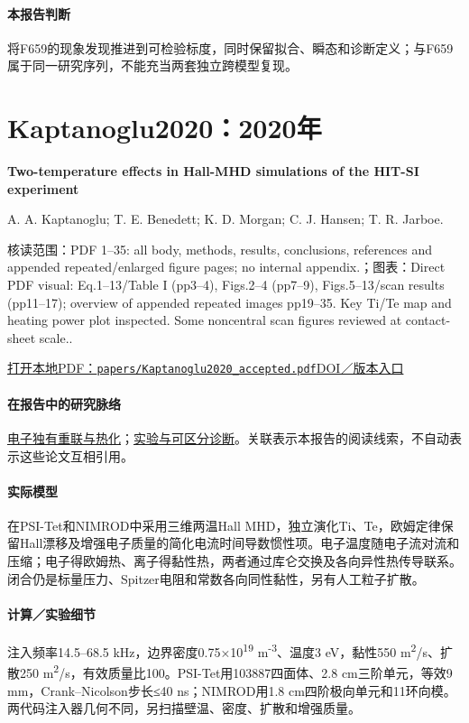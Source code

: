 \paragraph{本报告判断}将F659的现象发现推进到可检验标度，同时保留拟合、瞬态和诊断定义；与F659属于同一研究序列，不能充当两套独立跨模型复现。

\section{Kaptanoglu2020：2020年}\label{paper:Kaptanoglu2020}

\textbf{Two-temperature effects in Hall-MHD simulations of the HIT-SI experiment}\citep{Kaptanoglu2020}\

A. A. Kaptanoglu;  T. E. Benedett;  K. D. Morgan;  C. J. Hansen;  T. R. Jarboe.

\textsf{核读范围：}PDF 1–35: all body,  methods,  results,  conclusions,  references and appended repeated/enlarged figure pages;  no internal appendix.；\textsf{图表：}Direct PDF visual: Eq.1–13/Table I (pp3–4),  Figs.2–4 (pp7–9),  Figs.5–13/scan results (pp11–17);  overview of appended repeated images pp19–35. Key Ti/Te map and heating power plot inspected. Some noncentral scan figures reviewed at contact-sheet scale..

\href{run:papers/Kaptanoglu2020_accepted.pdf}{打开本地PDF：\texttt{papers/Kaptanoglu2020\_accepted.pdf}}\quad\href{https://doi.org/10.1063/5.0006311}{DOI／版本入口}

\paragraph{在报告中的研究脉络}\hyperref[story:energy]{电子独有重联与热化}；\hyperref[story:diagnostic]{实验与可区分诊断}。关联表示本报告的阅读线索，不自动表示这些论文互相引用。

\paragraph{实际模型}在PSI-Tet和NIMROD中采用三维两温Hall MHD，独立演化Ti、Te，欧姆定律保留Hall漂移及增强电子质量的简化电流时间导数惯性项。电子温度随电子流对流和压缩；电子得欧姆热、离子得黏性热，两者通过库仑交换及各向异性热传导联系。闭合仍是标量压力、Spitzer电阻和常数各向同性黏性，另有人工粒子扩散。

\paragraph{计算／实验细节}注入频率14.5–68.5 kHz，边界密度0.75×10\textsuperscript{19} m\textsuperscript{-3}、温度3 eV，黏性550 m\textsuperscript{2}/s、扩散250 m\textsuperscript{2}/s，有效质量比100。PSI-Tet用103887四面体、2.8 cm三阶单元，等效9 mm，Crank–Nicolson步长≤40 ns；NIMROD用1.8 cm四阶极向单元和11环向模。两代码注入器几何不同，另扫描壁温、密度、扩散和增强质量。

